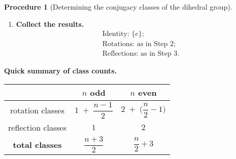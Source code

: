 \documentclass[12pt]{article}
\theoremstyle{definition} %
\newtheorem{procedure}{Procedure}
\theoremstyle{plain} %
\begin{document}
\begin{procedure}[Determining the conjugacy classes of the dihedral group]
\begin{enumerate}[label=\textbf{Step \arabic*.},leftmargin=2.8em]
            \vspace{2pt}
            \begin{itemize}
               \item If \(n\) is \emph{odd}, the map \(m\mapsto 2m\)
                     is a bijection on \(\mathbb{Z}/n\mathbb{Z}\); hence
                     the orbit of any \(k\) is all of \(\mathbb{Z}/n\mathbb{Z}\).
                     \[
                        \boxed{\text{All \(n\) reflections form one class.}}
                     \]
               \item If \(n\) is \emph{even}, the map \(m\mapsto 2m\)
                     hits only the even residues.
                     Thus the reflections split into two orbits:
                     \[
                       \begin{aligned}
                          \mathcal{R}_{0}
                             &=\{\,s r^{k}\;:\;k\text{ even}\},\\
                          \mathcal{R}_{1}
                             &=\{\,s r^{k}\;:\;k\text{ odd}\}.
                       \end{aligned}
                     \]
                     Each set has size \(n/2\) and is a conjugacy class.
                     (Geometrically these correspond to axes through
                     opposite vertices versus opposite edges of the regular
                     \(n\)-gon.)
            \end{itemize}
      
      \item \textbf{Collect the results.}
            \[
               \boxed{
                  \begin{aligned}
                     &\text{Identity: }\{e\};\\
                     &\text{Rotations: as in Step 2;}\\
                     &\text{Reflections: as in Step 3.}
                  \end{aligned}
               }
            \]
      
      \end{enumerate}
      
      \noindent\textbf{Quick summary of class counts.}
      
      \begin{center}
      \renewcommand{\arraystretch}{1.3}
      \begin{tabular}{c|c|c}
         & \(n\) odd & \(n\) even\\\hline
         rotation classes &
            \(1\;+\;\dfrac{n-1}{2}\)
               & \(2\;+\;\bigl(\dfrac{n}{2}-1\bigr)\)\\
         reflection classes & \(1\) & \(2\)\\\hline
         \textbf{total classes} &
            \(\dfrac{n+3}{2}\) &
            \(\dfrac{n}{2}+3\)
      \end{tabular}
      \end{center}
      \end{procedure}
\end{document}
